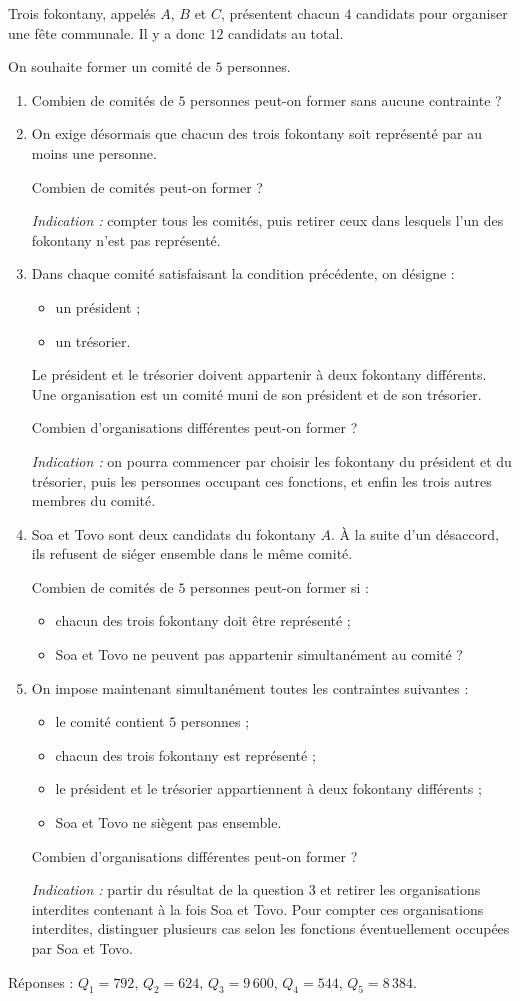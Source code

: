Trois fokontany, appelés $A$, $B$ et $C$, présentent chacun $4$ candidats
pour organiser une fête communale. Il y a donc $12$ candidats au total.

On souhaite former un comité de $5$ personnes.
\begin{enumerate}
  \item Combien de comités de $5$ personnes peut-on former sans aucune
  contrainte ?
  \item On exige désormais que chacun des trois fokontany soit représenté par
  au moins une personne.

  Combien de comités peut-on former ?

  \emph{Indication :} compter tous les comités, puis retirer ceux dans
  lesquels l'un des fokontany n'est pas représenté.
  \item Dans chaque comité satisfaisant la condition précédente, on désigne :
  \begin{itemize}
    \item un président ;
    \item un trésorier.
  \end{itemize}
  Le président et le trésorier doivent appartenir à deux fokontany
  différents. Une organisation est un comité muni de son président et de son
  trésorier.

  Combien d'organisations différentes peut-on former ?

  \emph{Indication :} on pourra commencer par choisir les fokontany du
  président et du trésorier, puis les personnes occupant ces fonctions, et
  enfin les trois autres membres du comité.
  \item Soa et Tovo sont deux candidats du fokontany $A$. À la suite d'un
  désaccord, ils refusent de siéger ensemble dans le même comité.

  Combien de comités de $5$ personnes peut-on former si :
  \begin{itemize}
    \item chacun des trois fokontany doit être représenté ;
    \item Soa et Tovo ne peuvent pas appartenir simultanément au comité ?
  \end{itemize}
  \item On impose maintenant simultanément toutes les contraintes suivantes :
  \begin{itemize}
    \item le comité contient $5$ personnes ;
    \item chacun des trois fokontany est représenté ;
    \item le président et le trésorier appartiennent à deux fokontany
    différents ;
    \item Soa et Tovo ne siègent pas ensemble.
  \end{itemize}
  Combien d'organisations différentes peut-on former ?

  \emph{Indication :} partir du résultat de la question 3 et retirer les
  organisations interdites contenant à la fois Soa et Tovo. Pour compter ces
  organisations interdites, distinguer plusieurs cas selon les fonctions
  éventuellement occupées par Soa et Tovo.
\end{enumerate}

\medskip
Réponses : $Q_1 = 792$, $Q_2 = 624$, $Q_3 = 9\,600$, $Q_4 = 544$,
$Q_5 = 8\,384$.
